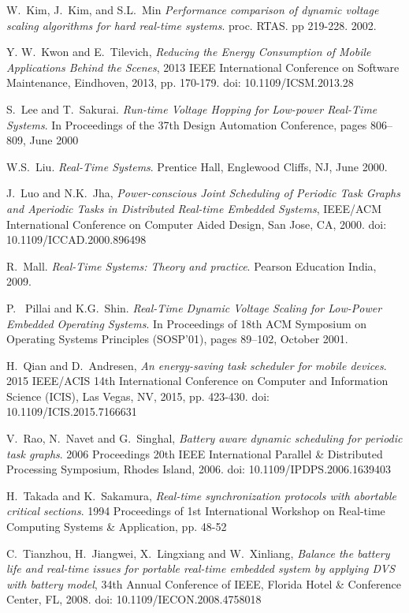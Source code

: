 \documentclass[10pt,article]{IEEEtran}
\begin{document}
\begin{thebibliography}{1}
W.~Kim, J.~Kim, and S.L.~Min \emph{Performance comparison of dynamic voltage scaling algorithms for hard real-time systems}. proc. RTAS. pp 219-228. 2002.

Y. W.~Kwon and E.~Tilevich, \emph{Reducing the Energy Consumption of Mobile Applications Behind the Scenes}, 2013 IEEE International Conference on Software Maintenance, Eindhoven, 2013, pp. 170-179. doi: 10.1109/ICSM.2013.28

S.~Lee and T.~Sakurai. \emph{Run-time Voltage Hopping for Low-power Real-Time Systems}. In Proceedings of the 37th Design Automation Conference, pages 806–809, June 2000

W.S.~Liu. \emph{Real-Time Systems}. Prentice Hall, Englewood Cliffs, NJ, June 2000.

J.~Luo and N.K.~Jha, \emph{Power-conscious Joint Scheduling of Periodic Task Graphs and Aperiodic Tasks in Distributed Real-time Embedded Systems}, IEEE/ACM International Conference on Computer Aided Design, San Jose, CA, 2000. doi: 10.1109/ICCAD.2000.896498

R.~Mall. \emph{Real-Time Systems: Theory and practice}. Pearson Education India, 2009.

P.~ Pillai and K.G.~Shin. \emph{Real-Time Dynamic Voltage Scaling
for Low-Power Embedded Operating Systems}.  In Proceedings of 18th ACM Symposium on Operating Systems Principles (SOSP’01), pages 89–102, October 2001.

H.~Qian and D.~Andresen, \emph{An energy-saving task scheduler for mobile devices}. 2015 IEEE/ACIS 14th International Conference on Computer and Information Science (ICIS), Las Vegas, NV, 2015, pp. 423-430.
doi: 10.1109/ICIS.2015.7166631

V.~Rao, N.~Navet and G.~Singhal, \emph{Battery aware dynamic scheduling for periodic task graphs}. 2006 Proceedings 20th IEEE International Parallel \& Distributed Processing Symposium, Rhodes Island, 2006. doi: 10.1109/IPDPS.2006.1639403  

H.~Takada and K.~Sakamura, \emph{Real-time synchronization protocols with abortable critical sections}. 1994 Proceedings of 1st International Workshop on Real-time Computing Systems \& Application, pp. 48-52

C.~Tianzhou, H.~Jiangwei, X.~Lingxiang and W.~Xinliang, \emph{Balance the battery life and real-time issues for portable real-time embedded system by applying DVS with battery model}, 34th Annual Conference of IEEE, Florida Hotel \& Conference Center, FL, 2008. doi: 10.1109/IECON.2008.4758018


\end{thebibliography}
\end{document}
